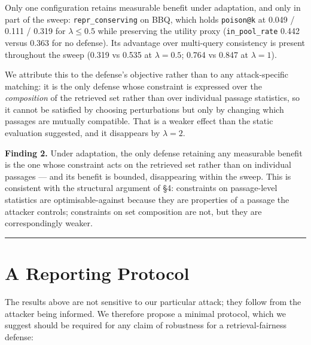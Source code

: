 \documentclass[review,3p,times]{elsarticle}
\begin{document}
Only one configuration retains measurable benefit under adaptation, and only in part of the sweep: \texttt{repr\_conserving} on BBQ, which holds \texttt{poison@k} at 0.049 / 0.111 / 0.319 for \(\lambda \le 0.5\) while preserving the utility proxy (\texttt{in\_pool\_rate} 0.442 versus 0.363 for no defense). Its advantage over multi-query consistency is present throughout the sweep (0.319 vs 0.535 at \(\lambda = 0.5\); 0.764 vs 0.847 at \(\lambda = 1\)).

We attribute this to the defense's objective rather than to any attack-specific matching: it is the only defense whose constraint is expressed over the \emph{composition} of the retrieved set rather than over individual passage statistics, so it cannot be satisfied by choosing perturbations but only by changing which passages are mutually compatible. That is a weaker effect than the static evaluation suggested, and it disappears by \(\lambda = 2\).

\textbf{Finding 2.} Under adaptation, the only defense retaining any measurable benefit is the one whose constraint acts on the retrieved set rather than on individual passages --- and its benefit is bounded, disappearing within the sweep. This is consistent with the structural argument of §4: constraints on passage-level statistics are optimisable-against because they are properties of a passage the attacker controls; constraints on set composition are not, but they are correspondingly weaker.

\begin{center}\rule{0.5\linewidth}{0.5pt}\end{center}

\section{A Reporting Protocol}\label{a-reporting-protocol}

The results above are not sensitive to our particular attack; they follow from the attacker being informed. We therefore propose a minimal protocol, which we suggest should be required for any claim of robustness for a retrieval-fairness defense:
\end{document}
